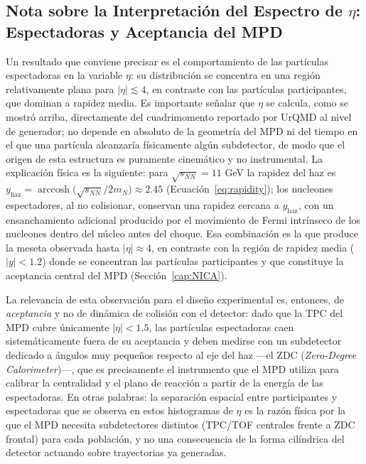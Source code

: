 \subsection{Nota sobre la Interpretación del Espectro de $\eta$: Espectadoras
y Aceptancia del MPD}
\label{sec:nota_eta_espectadoras}

\noindent
Un resultado que conviene precisar es el comportamiento de las partículas
espectadoras en la variable $\eta$: su distribución se concentra en una
región relativamente plana para $|\eta|\lesssim 4$, en contraste con las
partículas participantes, que dominan a rapidez media. Es importante
señalar que $\eta$ se calcula, como se mostró arriba, directamente del
cuadrimomento reportado por UrQMD al nivel de generador; no depende en
absoluto de la geometría del MPD ni del tiempo en el que una partícula
alcanzaría físicamente algún subdetector, de modo que el origen de esta
estructura es puramente cinemático y no instrumental. La explicación física
es la siguiente: para $\sqrt{s_{NN}}=11$ GeV la rapidez del haz es
$y_{\text{haz}}=\operatorname{arccosh}\!\big(\sqrt{s_{NN}}/2m_N\big)\approx
2.45$ (Ecuación~\ref{eq:rapidity}); los nucleones espectadores, al no
colisionar, conservan una rapidez cercana a $y_{\text{haz}}$, con un
ensanchamiento adicional producido por el movimiento de Fermi intrínseco de
los nucleones dentro del núcleo antes del choque. Esa combinación es la que
produce la meseta observada hasta $|\eta|\approx 4$, en contraste con la
región de rapidez media ($|y|<1.2$) donde se concentran las partículas
participantes y que constituye la aceptancia central del MPD
(Sección~\ref{cap:NICA}).

\noindent
La relevancia de esta observación para el diseño experimental es, entonces,
de \emph{aceptancia} y no de dinámica de colisión con el detector: dado que
la TPC del MPD cubre únicamente $|\eta|<1.5$, las partículas espectadoras
caen sistemáticamente fuera de su aceptancia y deben medirse con un
subdetector dedicado a ángulos muy pequeños respecto al eje del haz —el ZDC
(\textit{Zero-Degree Calorimeter})—, que es precisamente el instrumento que
el MPD utiliza para calibrar la centralidad y el plano de reacción a partir
de la energía de las espectadoras. En otras palabras: la separación
espacial entre participantes y espectadoras que se observa en estos
histogramas de $\eta$ es la razón física por la que el MPD necesita
subdetectores distintos (TPC/TOF centrales frente a ZDC frontal) para cada
población, y no una consecuencia de la forma cilíndrica del detector
actuando sobre trayectorias ya generadas.

